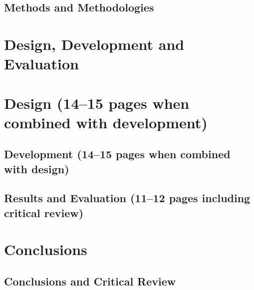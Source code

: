 \documentclass[11pt, a4paper]{article}
\begin{document}
\subsection{Methods and Methodologies}

\section {Design, Development and Evaluation}

\section{Design (14--15 pages when combined with development)}

\subsection {Development (14--15 pages when combined with design)}

\subsection {Results and Evaluation (11--12 pages including critical review)}

\section {Conclusions}

\subsection {Conclusions and Critical Review}

\printbibliography
\end{document}
